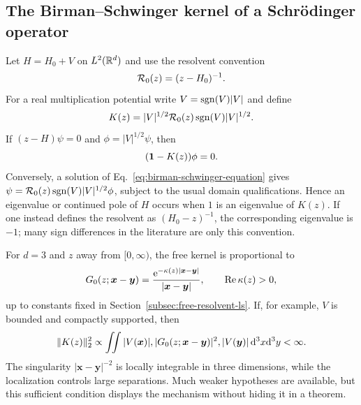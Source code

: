 \subsection{The Birman--Schwinger kernel of a Schr\"odinger operator}
\label{subsec:birman-schwinger}

Let $H=H_0+V$ on $L^2(\mathbb{R}^d)$ and use the resolvent convention
\begin{equation}
  \mathcal{R}_0(z)=(z-H_0)^{-1}.
  \label{eq:bs-free-resolvent}
\end{equation}
For a real multiplication potential write
$V=\operatorname{sgn}(V)|V|$ and define
\begin{equation}
  K(z)=|V|^{1/2}\mathcal{R}_0(z)\operatorname{sgn}(V)|V|^{1/2}.
  \label{eq:birman-schwinger-kernel}
\end{equation}
If $(z-H)\psi=0$ and $\phi=|V|^{1/2}\psi$, then
\begin{equation}
  (\mathbf{1}-K(z))\phi=0.
  \label{eq:birman-schwinger-equation}
\end{equation}
Conversely, a solution of Eq.~\eqref{eq:birman-schwinger-equation} gives
$\psi=\mathcal{R}_0(z)\operatorname{sgn}(V)|V|^{1/2}\phi$, subject to the usual
domain qualifications.  Hence an eigenvalue or continued pole of $H$ occurs
when $1$ is an eigenvalue of $K(z)$.  If one instead defines the resolvent as
$(H_0-z)^{-1}$, the corresponding eigenvalue is $-1$; many sign differences
in the literature are only this convention.

For $d=3$ and $z$ away from $[0,\infty)$, the free kernel is proportional to
\begin{equation}
  G_0(z;\bm x-\bm y)
  =\frac{\mathrm{e}^{-\kappa(z)|\bm x-\bm y|}}
  {|\bm x-\bm y|},
  \qquad \operatorname{Re}\kappa(z)>0,
  \label{eq:off-shell-free-green-decay}
\end{equation}
up to constants fixed in Section~\ref{subsec:free-resolvent-ls}.  If, for
example, $V$ is bounded and compactly supported, then
\begin{equation}
  \|K(z)\|_2^2
  \propto
  \iint
  |V(\bm x)|,|G_0(z;\bm x-\bm y)|^2,|V(\bm y)|
  \,\mathrm{d}^3x\mathrm{d}^3y<\infty.
  \label{eq:bs-hs-integral}
\end{equation}
The singularity $|\bm x-\bm y|^{-2}$ is locally integrable in three
dimensions, while the localization controls large separations.  Much weaker
hypotheses are available, but this sufficient condition displays the
mechanism without hiding it in a theorem.

